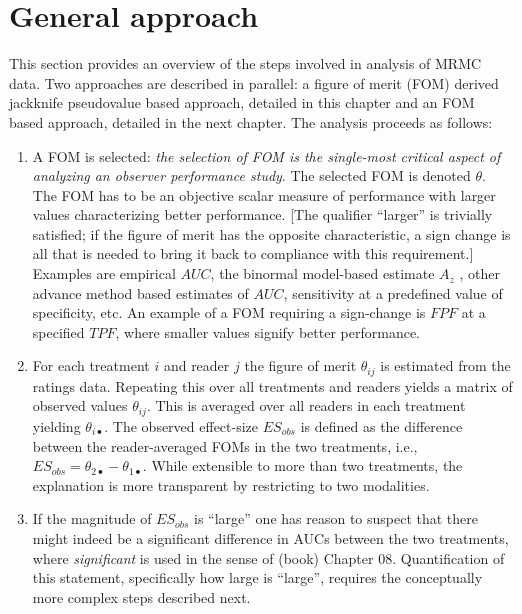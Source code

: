 \documentclass[
]{book}
\providecommand{\tightlist}{%
  \setlength{\itemsep}{0pt}\setlength{\parskip}{0pt}}
\begin{document}
\hypertarget{dbm-analysis-background-approach}{%
\section{General approach}\label{dbm-analysis-background-approach}}

This section provides an overview of the steps involved in analysis of MRMC data. Two approaches are described in parallel: a figure of merit (FOM) derived jackknife pseudovalue based approach, detailed in this chapter and an FOM based approach, detailed in the next chapter. The analysis proceeds as follows:

\begin{enumerate}
\def\labelenumi{\arabic{enumi}.}
\tightlist
\item
  A FOM is selected: \emph{the selection of FOM is the single-most critical aspect of analyzing an observer performance study}. The selected FOM is denoted \(\theta\). The FOM has to be an objective scalar measure of performance with larger values characterizing better performance. {[}The qualifier ``larger'' is trivially satisfied; if the figure of merit has the opposite characteristic, a sign change is all that is needed to bring it back to compliance with this requirement.{]} Examples are empirical \(AUC\), the binormal model-based estimate \(A_z\) , other advance method based estimates of \(AUC\), sensitivity at a predefined value of specificity, etc. An example of a FOM requiring a sign-change is \(FPF\) at a specified \(TPF\), where smaller values signify better performance.
\item
  For each treatment \(i\) and reader \(j\) the figure of merit \(\theta_{ij}\) is estimated from the ratings data. Repeating this over all treatments and readers yields a matrix of observed values \(\theta_{ij}\). This is averaged over all readers in each treatment yielding \(\theta_{i\bullet}\). The observed effect-size \(ES_{obs}\) is defined as the difference between the reader-averaged FOMs in the two treatments, i.e., \(ES_{obs} = \theta_{2\bullet}-\theta_{1\bullet}\). While extensible to more than two treatments, the explanation is more transparent by restricting to two modalities.
\item
  If the magnitude of \(ES_{obs}\) is ``large'' one has reason to suspect that there might indeed be a significant difference in AUCs between the two treatments, where \emph{significant} is used in the sense of (book) Chapter 08. Quantification of this statement, specifically how large is ``large'', requires the conceptually more complex steps described next.


\end{enumerate}
\end{document}

